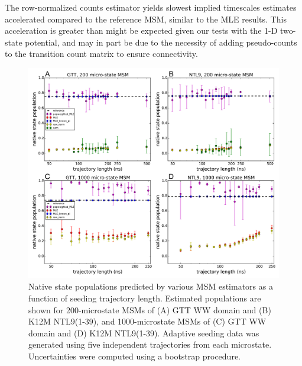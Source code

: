 \documentclass[%
 aip,
rsi,%
 amsmath,amssymb,
 reprint,%
]{revtex4-1}
\begin{document}
The row-normalized counts estimator yields slowest implied timescales estimates accelerated compared to the reference MSM, similar to the MLE results.  This acceleration is greater than might be expected given our tests with the 1-D two-state potential, and may in part be due to the necessity of adding pseudo-counts to the transition count matrix to ensure connectivity.


\begin{figure}[ht!]
\includegraphics[width=0.55\paperwidth]{figures/native_population_5trajs_cluster200_1000_omi_new.pdf}%
\caption{Native state populations predicted by various MSM estimators as a function of seeding trajectory length. Estimated populations are shown for 200-microstate MSMs of (A) GTT WW domain and (B) K12M NTL9(1-39), and 1000-microstate MSMs of (C) GTT WW domain and (D) K12M NTL9(1-39). Adaptive seeding data was generated using five independent trajectories from each microstate. Uncertainties were computed using a bootstrap procedure.}
\label{fig:all-atom-nativepops-5seeds}
\end{figure}
\end{document}
